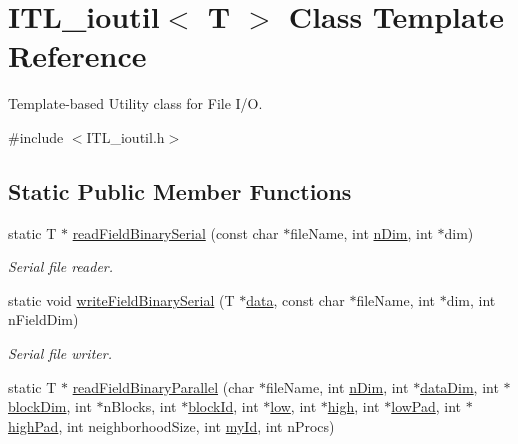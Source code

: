 \hypertarget{classITL__ioutil}{
\section{ITL\_\-ioutil$<$ T $>$ Class Template Reference}
\label{classITL__ioutil}
}


Template-\/based Utility class for File I/O.  




{\ttfamily \#include $<$ITL\_\-ioutil.h$>$}

\subsection*{Static Public Member Functions}
\begin{DoxyCompactItemize}
\item 
static T $\ast$ \hyperlink{classITL__ioutil_a07684c0af4216162b822f5f66554226f}{readFieldBinarySerial} (const char $\ast$fileName, int \hyperlink{MainIT__regvector_8cpp_a49f80c85e94dab34e43eefa8569b847a}{nDim}, int $\ast$dim)
\begin{DoxyCompactList}\small\item\em Serial file reader. \item\end{DoxyCompactList}\item 
static void \hyperlink{classITL__ioutil_aa5b0c964006ea184dbc7303bdf4a3424}{writeFieldBinarySerial} (T $\ast$\hyperlink{MainIT__regvector_8cpp_a783b2b1c03f80ec0d3ed965238d6bd65}{data}, const char $\ast$fileName, int $\ast$dim, int nFieldDim)
\begin{DoxyCompactList}\small\item\em Serial file writer. \item\end{DoxyCompactList}\item 
static T $\ast$ \hyperlink{classITL__ioutil_a64c092f58c5d77ab115ddb140f9744cd}{readFieldBinaryParallel} (char $\ast$fileName, int \hyperlink{MainIT__regvector_8cpp_a49f80c85e94dab34e43eefa8569b847a}{nDim}, int $\ast$\hyperlink{MainIT__regvector_8cpp_a1b6b235a26917090521e783da84ef326}{dataDim}, int $\ast$\hyperlink{MainIT__regvector_8cpp_a3d5a7fab820f74511d7978e3611ae905}{blockDim}, int $\ast$nBlocks, int $\ast$\hyperlink{MainIT__regvector_8cpp_a3b0be19f729a7cb8162d1f92e1f650fb}{blockId}, int $\ast$\hyperlink{MainIT__regvector_8cpp_abb1e2dad97264e859f3ee8af1341d68c}{low}, int $\ast$\hyperlink{MainIT__regvector_8cpp_a2012a18ba7a98e566c072356d03c4240}{high}, int $\ast$\hyperlink{MainIT__regvector_8cpp_a4f25631e4cedb3a6318d8a9166ab454d}{lowPad}, int $\ast$\hyperlink{MainIT__regvector_8cpp_a41c49039cbd24b06ac2adf735b8e8bdf}{highPad}, int neighborhoodSize, int \hyperlink{MainIT__regvector_8cpp_a556290f6728d2e8721669d530981a077}{myId}, int nProcs)

\end{DoxyCompactItemize}
